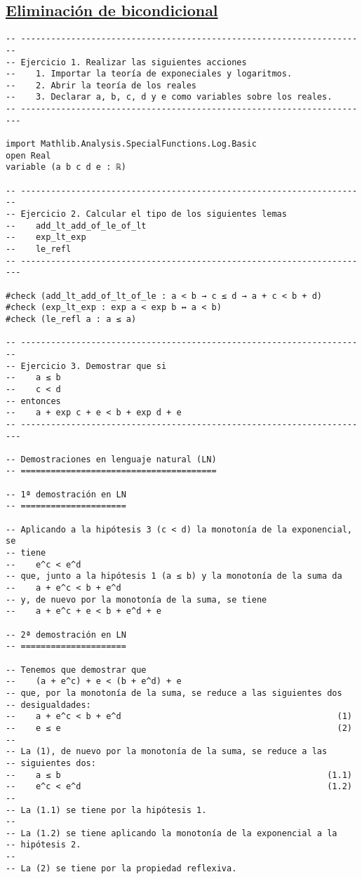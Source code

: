 \subsection{\href{./src/Basicos/Eliminacion\_de\_bicondicional.lean}{Eliminación de bicondicional}}
\label{sec:org2b84126}
\begin{verbatim}
-- ---------------------------------------------------------------------
-- Ejercicio 1. Realizar las siguientes acciones
--    1. Importar la teoría de exponeciales y logaritmos.
--    2. Abrir la teoría de los reales
--    3. Declarar a, b, c, d y e como variables sobre los reales.
-- ----------------------------------------------------------------------

import Mathlib.Analysis.SpecialFunctions.Log.Basic
open Real
variable (a b c d e : ℝ)

-- ---------------------------------------------------------------------
-- Ejercicio 2. Calcular el tipo de los siguientes lemas
--    add_lt_add_of_le_of_lt
--    exp_lt_exp
--    le_refl
-- ----------------------------------------------------------------------

#check (add_lt_add_of_lt_of_le : a < b → c ≤ d → a + c < b + d)
#check (exp_lt_exp : exp a < exp b ↔ a < b)
#check (le_refl a : a ≤ a)

-- ---------------------------------------------------------------------
-- Ejercicio 3. Demostrar que si
--    a ≤ b
--    c < d
-- entonces
--    a + exp c + e < b + exp d + e
-- ----------------------------------------------------------------------

-- Demostraciones en lenguaje natural (LN)
-- =======================================

-- 1ª demostración en LN
-- =====================

-- Aplicando a la hipótesis 3 (c < d) la monotonía de la exponencial, se
-- tiene
--    e^c < e^d
-- que, junto a la hipótesis 1 (a ≤ b) y la monotonía de la suma da
--    a + e^c < b + e^d
-- y, de nuevo por la monotonía de la suma, se tiene
--    a + e^c + e < b + e^d + e

-- 2ª demostración en LN
-- =====================

-- Tenemos que demostrar que
--    (a + e^c) + e < (b + e^d) + e
-- que, por la monotonía de la suma, se reduce a las siguientes dos
-- desigualdades:
--    a + e^c < b + e^d                                           (1)
--    e ≤ e                                                       (2)
--
-- La (1), de nuevo por la monotonía de la suma, se reduce a las
-- siguientes dos:
--    a ≤ b                                                     (1.1)
--    e^c < e^d                                                 (1.2)
--
-- La (1.1) se tiene por la hipótesis 1.
--
-- La (1.2) se tiene aplicando la monotonía de la exponencial a la
-- hipótesis 2.
--
-- La (2) se tiene por la propiedad reflexiva.


\end{verbatim}
